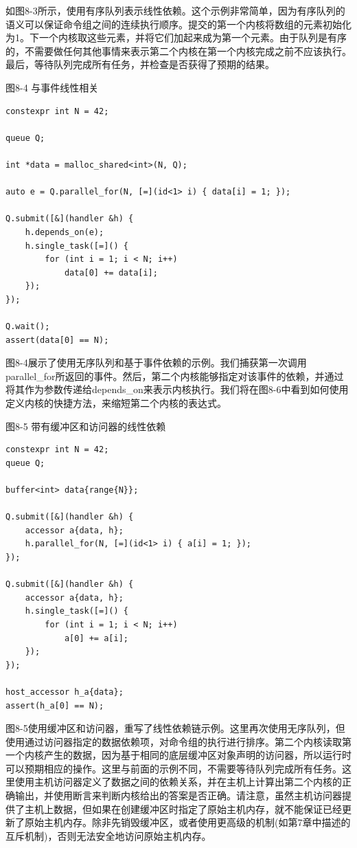 如图8-3所示，使用有序队列表示线性依赖。这个示例非常简单，因为有序队列的语义可以保证命令组之间的连续执行顺序。提交的第一个内核将数组的元素初始化为1。下一个内核取这些元素，并将它们加起来成为第一个元素。由于队列是有序的，不需要做任何其他事情来表示第二个内核在第一个内核完成之前不应该执行。最后，等待队列完成所有任务，并检查是否获得了预期的结果。\par

\hspace*{\fill} \par %
图8-4 与事件线性相关
\begin{lstlisting}[caption={}]
constexpr int N = 42;

queue Q;

int *data = malloc_shared<int>(N, Q);

auto e = Q.parallel_for(N, [=](id<1> i) { data[i] = 1; });

Q.submit([&](handler &h) {
	h.depends_on(e);
	h.single_task([=]() {
		for (int i = 1; i < N; i++)
			data[0] += data[i];
	});
});

Q.wait();
assert(data[0] == N);
\end{lstlisting}

图8-4展示了使用无序队列和基于事件依赖的示例。我们捕获第一次调用parallel\_for所返回的事件。然后，第二个内核能够指定对该事件的依赖，并通过将其作为参数传递给depends\_on来表示内核执行。我们将在图8-6中看到如何使用定义内核的快捷方法，来缩短第二个内核的表达式。\par

\hspace*{\fill} \par %
图8-5 带有缓冲区和访问器的线性依赖
\begin{lstlisting}[caption={}]
constexpr int N = 42;
queue Q;

buffer<int> data{range{N}};

Q.submit([&](handler &h) {
	accessor a{data, h};
	h.parallel_for(N, [=](id<1> i) { a[i] = 1; });
});

Q.submit([&](handler &h) {
	accessor a{data, h};
	h.single_task([=]() {
		for (int i = 1; i < N; i++)
			a[0] += a[i];
	});
});

host_accessor h_a{data};
assert(h_a[0] == N);
\end{lstlisting}

图8-5使用缓冲区和访问器，重写了线性依赖链示例。这里再次使用无序队列，但使用通过访问器指定的数据依赖项，对命令组的执行进行排序。第二个内核读取第一个内核产生的数据，因为基于相同的底层缓冲区对象声明的访问器，所以运行时可以预期相应的操作。这里与前面的示例不同，不需要等待队列完成所有任务。这里使用主机访问器定义了数据之间的依赖关系，并在主机上计算出第二个内核的正确输出，并使用断言来判断内核给出的答案是否正确。请注意，虽然主机访问器提供了主机上数据，但如果在创建缓冲区时指定了原始主机内存，就不能保证已经更新了原始主机内存。除非先销毁缓冲区，或者使用更高级的机制(如第7章中描述的互斥机制)，否则无法安全地访问原始主机内存。\par

